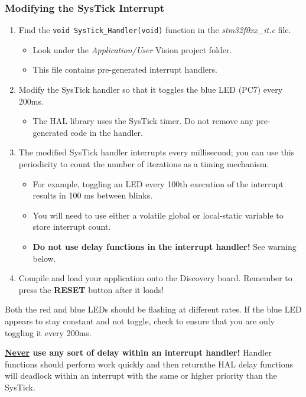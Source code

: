 \documentclass[openany,11pt,fleqn]{book} %
\begin{document}
\begin{exercise}
    \subsubsection{Modifying the SysTick Interrupt}
    \begin{enumerate}
        \item Find the \texttt{void SysTick\_Handler(void)} function in the \textit{stm32f0xx\_it.c} file. 
        \begin{itemize}
            \item Look under the \textit{Application/User} {\textmu}Vision project folder. 
            \item This file contains pre-generated interrupt handlers. 
        \end{itemize}
        \item Modify the SysTick handler so that it toggles the blue LED (PC7) every 200ms. 
        \begin{itemize}
            \item The HAL library uses the SysTick timer. Do not remove any pre-generated code in the handler.
        \end{itemize}
        \item The modified SysTick handler interrupts every millisecond; you can use this periodicity to count the number of iterations as a timing mechanism.
        \begin{itemize}
            \item For example, toggling an LED every 100th execution of the interrupt results in 100 ms between blinks.
            \item You will need to use either a volatile global or local-static variable to store interrupt count.
            \item \textbf{Do not use delay functions in the interrupt handler!} See warning below.
        \end{itemize}
    \item Compile and load your application onto the Discovery board. Remember to press the \textbf{RESET} button after it loads!
    \end{enumerate}

     Both the red and blue LEDs should be flashing at different rates. If the blue LED appears to stay constant and not toggle, check to ensure that you are only toggling it every 200ms.
\end{exercise}

\begin{warning}
    \textbf{\underline{Never} use any sort of delay within an interrupt handler!} Handler functions should perform work quickly and then return\textemdash the HAL delay functions will deadlock within an interrupt with the same or higher priority than the SysTick.
\end{warning}
\end{document}
